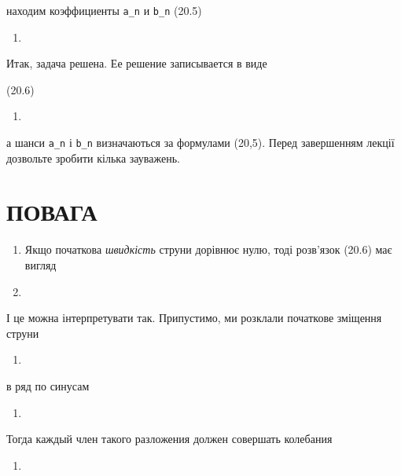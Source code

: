 \documentclass[
  ukrainian,
]{article}
\providecommand{\tightlist}{%
  \setlength{\itemsep}{0pt}\setlength{\parskip}{0pt}}
\begin{document}
находим коэффициенты \texttt{a\_n} и \texttt{b\_n} (20.5)

\begin{enumerate}
\def\labelenumi{\arabic{enumi}.}
\setcounter{enumi}{11}
\tightlist
\item
\end{enumerate}

Итак, задача решена. Ее решение записывается в виде

(20.6)

\begin{enumerate}
\def\labelenumi{\arabic{enumi}.}
\setcounter{enumi}{12}
\tightlist
\item
\end{enumerate}

а шанси \texttt{a\_n} і \texttt{b\_n} визначаються за формулами (20,5).
Перед завершенням лекції дозвольте зробити кілька зауважень.

\section{ПОВАГА}\label{ux43fux43eux432ux430ux433ux430}

\begin{enumerate}
\def\labelenumi{\arabic{enumi}.}
\item
  Якщо початкова \emph{швидкість} струни дорівнює нулю, тоді розв'язок
  (20.6) має вигляд
\item
\end{enumerate}

І це можна інтерпретувати так. Припустимо, ми розклали початкове
зміщення струни

\begin{enumerate}
\def\labelenumi{\arabic{enumi}.}
\setcounter{enumi}{14}
\tightlist
\item
\end{enumerate}

в ряд по синусам

\begin{enumerate}
\def\labelenumi{\arabic{enumi}.}
\setcounter{enumi}{15}
\tightlist
\item
\end{enumerate}

Тогда каждый член такого разложения должен совершать колебания

\begin{enumerate}
\def\labelenumi{\arabic{enumi}.}
\setcounter{enumi}{16}
\tightlist
\item
\end{enumerate}
\end{document}
